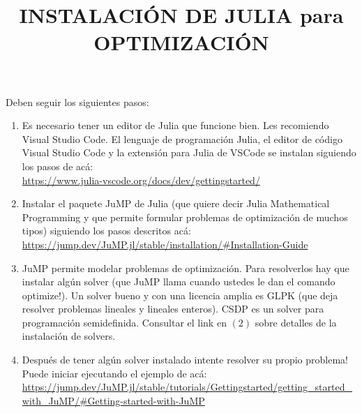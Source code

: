 \documentclass[12pt, a4paper]{article}
\begin{document}
\title{INSTALACI\'ON DE JULIA para OPTIMIZACI\'ON}
\date{}
\maketitle

Deben seguir los siguientes pasos:

\begin{enumerate}
\item Es necesario tener un editor de Julia que funcione bien. Les recomiendo Visual Studio Code. El lenguaje de programaci\'on Julia, el editor de c\'odigo Visual Studio Code y la extensi\'on para Julia de VSCode se instalan siguiendo los pasos de ac\'a:\\
\url{https://www.julia-vscode.org/docs/dev/gettingstarted/}

\item Instalar el paquete JuMP de Julia (que quiere decir Julia Mathematical Programming y que permite formular problemas de optimizaci\'on de muchos tipos) siguiendo los pasos descritos ac\'a:\\
\url{https://jump.dev/JuMP.jl/stable/installation/#Installation-Guide}

\item JuMP permite modelar problemas de optimizaci\'on. Para resolverlos hay que instalar alg\'un solver (que JuMP llama cuando ustedes le dan el comando optimize!). Un solver bueno y con una licencia amplia es GLPK (que deja resolver problemas lineales y lineales enteros). CSDP es un solver para programaci\'on semidefinida. Consultar el link en $(2)$ sobre detalles de la instalaci\'on de solvers.


\item Despu\'es de tener alg\'un solver instalado intente resolver su propio problema! Puede iniciar ejecutando el ejemplo de ac\'a:\\
\url{https://jump.dev/JuMP.jl/stable/tutorials/Gettingstarted/getting_started_with_JuMP/#Getting-started-with-JuMP}



\end{enumerate}
\end{document}
